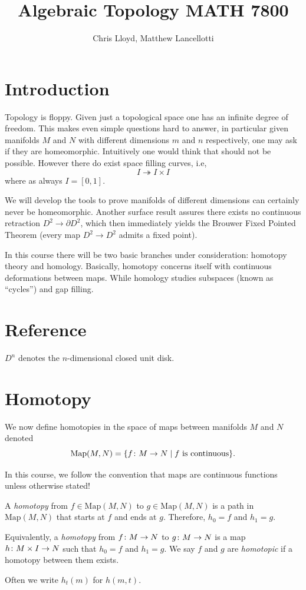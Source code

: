 \documentclass[11pt,leqno,oneside]{amsart}
\title[Algebraic Topology]{Algebraic Topology MATH 7800}
\author{Chris Lloyd, Matthew Lancellotti}
\date{}
\newenvironment{dateenv}{
  \vspace{1em}
}{
  \vspace{1em}
}
\newcommand{\mydate}[4]{
  \newdate{#1}{#2}{#3}{#4}
  \begin{dateenv}
    \hfill\displaydate{#1}
  \end{dateenv}
}
\numberwithin{thm}{section}
\renewcommand{\d}{\partial}
\newcommand{\x}{\times}
\newcommand{\Map}{\text{Map}}
\begin{document}
\maketitle \newpage

\mydate{d1}{18}{1}{2017}

\section{Introduction}

Topology is floppy. Given just a topological space one has an infinite
degree of freedom. This makes even simple questions hard to answer, in
particular given manifolds \(M\) and \(N\) with different dimensions
\(m\) and \(n\) respectively, one may ask if they are
homeomorphic. Intuitively one would think that should not be
possible. However there do exist space filling curves, i.e,
\[I \twoheadrightarrow I \times I\]
where as always \(I=[0,1]\).

We will develop the tools to prove manifolds of different dimensions can
certainly never be homeomorphic. Another surface result assures there exists no continuous
retraction \(D^2 \to \d D^2\), which then immediately yields the
Brouwer Fixed Pointed Theorem (every map \(D^2 \to D^2\) admits a
fixed point).

In this course there will be two basic branches under consideration:
homotopy theory and homology. Basically, homotopy concerns itself with
continuous deformations between maps. While homology studies subspaces
(known as ``cycles'') and gap filling.

\section{Reference}
%
\begin{defn}
  $D^n$ denotes the $n$-dimensional closed unit disk.
\end{defn}

\section{Homotopy}

We now define homotopies in the space of maps between manifolds \(M\)
and \(N\) denoted
\[\Map(M,N)=\{f \from M \to N \mid \text{$f$ is continuous}\}.\]

In this course, we follow the convention that maps are continuous
functions unless otherwise stated!

\begin{defn}
  A \emph{homotopy} from \(f \in \Map(M, N)\) to \(g \in \Map(M, N)\) is a path in $\Map(M, N)$ that starts at $f$ and ends at $g$.  Therefore, $h_0 = f$ and $h_1 = g$.

  Equivalently, a \emph{homotopy} from \(f \colon M \to N\) to \(g \colon M \to N\)
  is a map \(h\from M \x I \to N\) such that \(h_0=f\) and \(h_1=g\). We say \(f\) and
  \(g\) are \emph{homotopic} if a homotopy between them exists.

  Often we write \(h_t(m)\) for \(h(m,t)\).
\end{defn}
\end{document}
